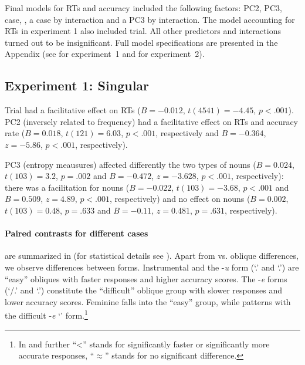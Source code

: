 \documentclass[output=paper, modfonts,newtxmath,hidelinks]{langscibook}
\begin{document}
Final models for RTs and accuracy included the following factors: PC2, PC3, case, , a case by  interaction and a PC3 by  interaction. The model accounting for RTs in experiment 1 also included trial. All other predictors and interactions turned out to be insignificant. Full model specifications are presented in the Appendix (see  for experiment~1 and  for experiment~2).

\subsection{Experiment 1: Singular}

Trial had a facilitative effect on RTs ($B=-0.012$, $t(4541)=-4.45$, $p<.001$). PC2 (inversely related to frequency) had a facilitative effect on RTs and accuracy rate ($B= 0.018$, $t(121)= 6.03$, $p< .001$, respectively and $B= -0.364$, $z= -5.86$, $p< .001$, respectively). 

PC3 (entropy meausures) affected differently the two types of nouns ($B= 0.024$, $t(103)= 3.2$, $p= .002$ and $B= -0.472$, $z= -3.628$, $p< .001$, respectively):  there was a facilitation for  nouns ($B= -0.022$, $t(103)= -3.68$, $p< .001$ and $B= 0.509$, $z= 4.89$, $p< .001$, respectively) and no effect on  nouns ($B= 0.002$, $t(103)= 0.48$, $p= .633$ and $B= -0.11$, $z= 0.481$, $p= .631$, respectively).

\paragraph*{Paired contrasts for different cases} are summarized in  (for statistical details see ). Apart from  vs. oblique differences, we observe differences between  forms. Instrumental and the -\textit{u} form (`\accc.\fem' and `\datt.\masc') are ``easy'' obliques with faster responses and higher accuracy scores. The -\textit{e} forms (`\datt/\locc.\fem' and `\locc.\masc') constitute the ``difficult'' oblique group with slower responses and lower accuracy scores. Feminine  falls into the ``easy'' group, while   patterns with the difficult -\textit{e} `\locc' form.\footnote{In  and further ``<'' stands for significantly faster or significantly more accurate responses, ``$\approx$'' stands for no significant difference.}
\end{document}
